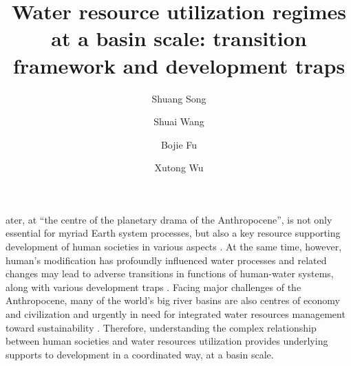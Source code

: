 \documentclass[9pt, twocolumn, twoside, lineno]{pnas-new}
\title{Water resource utilization regimes at a basin scale: transition framework and development traps}
\author[a, b]{Shuang Song}  %
\author[a, b, 1]{Shuai Wang}  %
\author[a, b]{Bojie Fu}  %
\author[c, d]{Xutong Wu}  %
\affil[a]{ %
	State Key Laboratory of Earth Surface Processes and Resource Ecology, 
	Faculty of Geographical Science, 
	Beijing Normal University, 
	Beijing 100875, 
	P.R. China
}
\affil[b]{ %
	Institute of Land Surface System and Sustainability, 
	Faculty of Geographical Science, 
	Beijing Normal University, 
	Beijing 100875, 
	P.R. China
}
\affil[c]{ %
	College of Urban and Environmental Sciences, 
	Peking University, 
	Beijing 100871, 
	P.R. China
}
\affil[d]{ %
	State Key Laboratory of Urban and Regional Ecology, 
	Research Center for Eco-Environmental Sciences, 
	Chinese Academy of Sciences, 
	Beijing 100085, 
	P.R. China 
}
\begin{document}
\maketitle
\thispagestyle{firststyle}


ater, at “the centre of the planetary drama of the Anthropocene”, is not only essential for myriad Earth system processes, but also a key resource supporting development of human societies in various aspects \cite{gleesonIlluminatingWaterCycle2020}. At the same time, however, human's modification has profoundly influenced water processes and related changes may lead to adverse transitions in functions of human-water systems, along with various development traps \cite{cummingLinkingEconomicGrowth2018}. Facing major challenges of the Anthropocene, many of the world's big river basins are also centres of economy and civilization and urgently in need for integrated water resources management toward sustainability \cite{bestAnthropogenicStressesWorld2019}. Therefore, understanding the complex relationship between human societies and water resources utilization provides underlying supports to development in a coordinated way, at a basin scale\cite{HuangHeFangZongZongHeShiCeShiShiDiaoDuGuGanShuiKu}.
\end{document}
